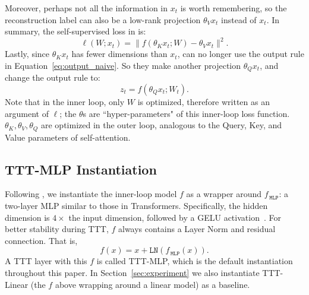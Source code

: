 Moreover, perhaps not all the information in $x_t$ is worth remembering, so the reconstruction label can also be a low-rank projection $\theta_Vx_t$ instead of $x_t$.
In summary, the self-supervised loss in \cite{sun2024ttt} is:
\begin{equation}
\label{eq:multi}
\ell(W; x_t) = \| f\left(\theta_K x_t; W\right) - \theta_V x_t \|^2.
\end{equation}
Lastly, since $\theta_Kx_t$ has fewer dimensions than $x_t$, \cite{sun2024ttt} can no longer use the output rule in Equation~\ref{eq:output_naive}.
So they make another projection $\theta_Qx_t$, and change the output rule to:
\begin{equation}
\label{eq:output}
z_t = f\left(\theta_Qx_t; W_t\right).
\end{equation}
Note that in the inner loop, only $W$ is optimized, therefore written as an argument of $\ell$; the $\theta$s are ``hyper-parameters" of this inner-loop loss function.
$\theta_K,\theta_V,\theta_Q$ are optimized in the outer loop, analogous to the Query, Key, and Value parameters of self-attention.

\subsection{TTT-MLP Instantiation}
Following \cite{sun2024ttt}, we instantiate the inner-loop model $f$ as a wrapper around $f_{\,\texttt{MLP}}$: a two-layer MLP similar to those in Transformers.
Specifically, the hidden dimension is $4 \times$ the input dimension, followed by a GELU activation~\cite{hendrycks2016gaussian}.
For better stability during TTT, $f$ always contains a Layer Norm and residual connection. That is,
$$f(x) = x + \texttt{LN}(f_{\,\texttt{MLP}}(x)).$$
A TTT layer with this $f$ is called TTT-MLP, which is the default instantiation throughout this paper.
In Section~\ref{sec:experiment} we also instantiate TTT-Linear (the $f$ above wrapping around a linear model) as a baseline.